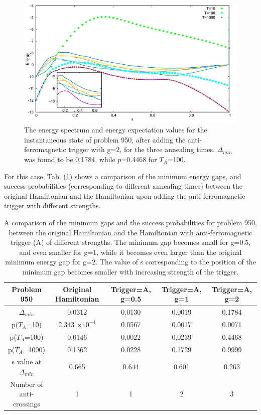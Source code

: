 \documentclass[../main.tex]{subfiles}
\begin{document}
\begin{figure}[H]
\centering 
\includegraphics[scale=0.24]{950_s12_A_g2.png}
\caption{The energy spectrum and energy expectation values for the instantaneous state of problem 950, after adding the anti-ferromagnetic trigger with g=2, for the three annealing times. $\Delta_{min}$ was found to be 0.1784, while $p$=0.4468 for $T_A$=100. }
\label{fig:a6}
\end{figure}
For this case, Tab. (\ref{tab:a2}) shows a comparison of the minimum energy gaps, and success probabilities (corresponding to different annealing times) between the original Hamiltonian and the Hamiltonian upon adding the anti-ferromagnetic trigger with different strengths. 

\begin{table}[H]
\centering
\renewcommand{\arraystretch}{1.5}
\begin{tabular}{|c|c|c|c|c|}
\hline 
Problem 950 & Original Hamiltonian & Trigger=A, g=0.5 & Trigger=A, g=1 & Trigger=A, g=2 \\ 
\hline 
$\Delta_{min}$ & 0.0312 & 0.0130 & 0.0019 & 0.1784 \\ 
\hline 
p($T_A$=10) & 2.343 $\times 10^{-4}$ & 0.0567 & 0.0017 & 0.0071\\ 
\hline 
p($T_A$=100) & 0.0146 & 0.0022 & 0.0239 & 0.4468 \\ 
\hline 
p($T_A$=1000) & 0.1362 & 0.0228 & 0.1729 & 0.9999 \\ 
\hline 
s value at $\Delta_{min}$ & 0.665 & 0.644 & 0.601 & 0.263 \\ 
\hline 
Number of anti-crossings & 1 & 1 & 2 & 3 \\
\hline
\end{tabular} 
\caption{A comparison of the minimum gaps and the success probabilities for problem 950, between the original Hamiltonian and the Hamiltonian with anti-ferromagnetic trigger (A) of different strengths. The minimum gap becomes small for g=0.5, and even smaller for g=1, while it becomes even larger than the original minimum energy gap for g=2. The value of s corresponding to the position of the minimum gap becomes smaller with increasing strength of the trigger.}
\label{tab:a2}
\end{table}
\end{document}
